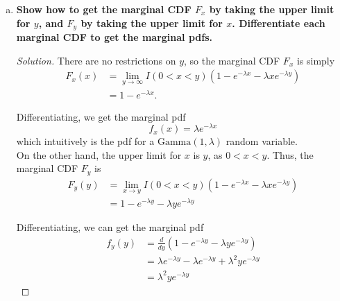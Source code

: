 \documentclass[11pt]{article}
\newenvironment{solution}
  {\renewcommand\qedsymbol{$\blacksquare$}\begin{proof}[Solution]}
  {\end{proof}}
\begin{document}
\begin{enumerate}
\begin{enumerate}[a)]
\begin{solution}
      \begin{align*}
        F_{xy}(x, y) &= \int_0^x \int_0^{y - V_1} \left( \lambda e^{-\lambda V_1} \right) \left( \lambda e^{-\lambda V_2} \right) dV_2 \, dV_1 \\
        &= \int_0^x \left[ -\lambda e^{-\lambda(V_1 + V_2)} \right]_0^{y-V_1} \, dV_1 \\
        &= \int_0^x -\lambda e^{-\lambda y} + \lambda e^{-\lambda V_1} \, dV_1 \\
        &= \left[ -V_1 \lambda e^{-\lambda y} - e^{-\lambda V_1} \right]_0^x \\
        &= 1 - e^{-\lambda x} - \lambda xe^{-\lambda y},
      \end{align*}
      so the joint CDF for $X$ and $Y$ (with the extra restriction $0 < x < y$) is
      \[
        \boxed{F_{xy}(x, y) = I(0 < x < y) \left(1 - e^{-\lambda x} - \lambda xe^{-\lambda y}\right)}. \qedhere
      \]
    \end{solution}
      \item \textbf{Show how to get the marginal CDF $F_x$ by taking the upper limit for $y$, and $F_y$ by taking the upper limit for $x$. Differentiate each marginal CDF to get the marginal pdfs.}
      \begin{solution}
      There are no restrictions on $y$, so the marginal CDF $F_x$ is simply
      \begin{align*}
        F_x(x) &= \lim_{y \to \infty} I(0 < x < y) \left(1 - e^{-\lambda x} - \lambda xe^{-\lambda y}\right) \\
        &= \boxed{1 - e^{-\lambda x}}.
      \end{align*}

      Differentiating, we get the marginal pdf
      \[
        \boxed{f_x(x) = \lambda e^{-\lambda x}}
      \]
      which intuitively is the pdf for a $\mathrm{Gamma}(1, \lambda)$ random variable. \\

      On the other hand, the upper limit for $x$ is $y$, as $0 < x < y$. Thus, the marginal CDF $F_y$ is
      \begin{align*} 
        F_y(y) &= \lim_{x \to y} I(0 < x < y) \left(1 - e^{-\lambda x} - \lambda xe^{-\lambda y}\right) \\
        &= \boxed{1 - e^{-\lambda y} - \lambda ye^{-\lambda y}}
      \end{align*}

      Differentiating, we can get the marginal pdf
      \begin{align*}
        f_y(y) &= \frac{d}{dy} \left( 1 - e^{-\lambda y} - \lambda ye^{-\lambda y} \right) \\
        &= \lambda e^{-\lambda y} - \lambda e^{-\lambda y} + \lambda^2 y e^{-\lambda y} \\
        &= \boxed{\lambda^2 y e^{-\lambda y}}
      \end{align*}


\end{solution}
\end{enumerate}
\end{enumerate}
\end{document}
